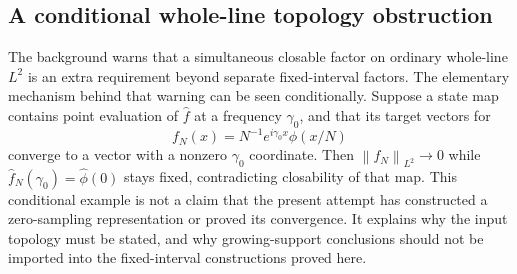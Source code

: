 \documentclass[11pt]{article}
\numberwithin{equation}{section}
\theoremstyle{definition}
\theoremstyle{remark}
\newcommand{\norm}[1]{\left\lVert#1\right\rVert}
\begin{document}
\subsection{A conditional whole-line topology obstruction}
The background warns that a simultaneous closable factor on ordinary whole-line $L^2$ is an extra requirement beyond separate fixed-interval factors. The elementary mechanism behind that warning can be seen conditionally. Suppose a state map contains point evaluation of $\widehat f$ at a frequency $\gamma_0$, and that its target vectors for
\begin{equation}
 f_N(x)=N^{-1}e^{i\gamma_0x}\phi(x/N)
\end{equation}
converge to a vector with a nonzero $\gamma_0$ coordinate. Then $\norm{f_N}_{L^2}\to0$ while $\widehat f_N(\gamma_0)=\widehat\phi(0)$ stays fixed, contradicting closability of that map. This conditional example is not a claim that the present attempt has constructed a zero-sampling representation or proved its convergence. It explains why the input topology must be stated, and why growing-support conclusions should not be imported into the fixed-interval constructions proved here.
\end{document}
